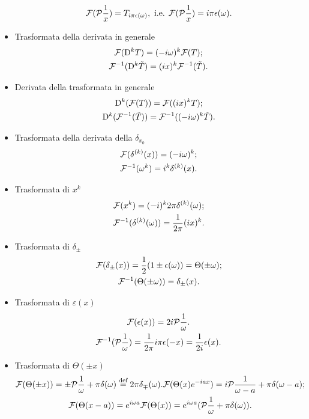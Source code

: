 \begin{itemize}
        \[
            \mathcal{F}({\mathcal{P}\frac{1}{x}})=T_{i\pi\epsilon(\omega)},\text{ i.e. } \mathcal{F}({\mathcal{P}\frac{1}{x}})=i\pi\epsilon(\omega).
        \]
    \item Trasformata della derivata in generale
        \begin{gather*}
            \mathcal{F}(\mathrm{D}^kT)=(-i\omega)^k\mathcal{F}(T);\\
            \mathcal{F}^{-1}(\mathrm{D}^k\Tilde{T})=(ix)^k\mathcal{F}^{-1}(\Tilde{T}).
        \end{gather*}
    \item Derivata della trasformata in generale
        \begin{gather*}
            \mathrm{D}^k(\mathcal{F}(T))=\mathcal{F}((ix)^kT);\\
            \mathrm{D}^k(\mathcal{F}^{-1}(\Tilde{T}))=\mathcal{F}^{-1}((-i\omega)^k\Tilde{T}).
        \end{gather*}
    \item Trasformata della derivata della $\delta_{x_0}$
        \begin{gather*}
            \mathcal{F}(\delta^{(k)}(x))=(-i\omega)^k;\\
            \mathcal{F}^{-1}(\omega^k)=i^k\delta^{(k)}(x).
        \end{gather*}
    \item Trasformata di $x^k$
        \begin{gather*}
            \mathcal{F}(x^k)=(-i)^k2\pi\delta^{(k)}(\omega);\\
            \mathcal{F}^{-1}(\delta^{(k)}(\omega))=\frac{1}{2\pi}(ix)^k.
        \end{gather*}
    \item Trasformata di $\delta_\pm$
        \begin{gather*}
            \mathcal{F}(\delta_{\pm}(x))=\frac{1}{2}(1\pm\epsilon(\omega))=\Theta(\pm\omega);\\
            \mathcal{F}^{-1}(\Theta(\pm\omega))=\delta_\pm(x).
        \end{gather*}
    \item Trasformata di $\varepsilon(x)$
        \begin{gather*}
            \mathcal{F}(\epsilon(x))=2i\mathcal{P}\frac{1}{\omega}.\\
            \mathcal{F}^{-1}(\mathcal{P}\frac{1}{\omega})=\frac{1}{2\pi}i\pi\epsilon(-x)=\frac{1}{2i}\epsilon(x).
        \end{gather*}
    \item Trasformata di $\Theta(\pm x)$
        \begin{gather*}
            \mathcal{F}(\Theta(\pm x))=\pm\mathcal{P}\frac{1}{\omega}+\pi\delta(\omega)\stackrel{\text{def}}{=}2\pi\delta_\mp(\omega).
            \mathcal{F}(\Theta(x)e^{-iax})=i\mathcal{P}\frac{1}{\omega-a}+\pi\delta(\omega-a);\\
            \mathcal{F}(\Theta(x-a))=e^{i\omega a}\mathcal{F}(\Theta(x))=e^{i\omega a}(\mathcal{P}\frac{1}{\omega}+\pi\delta(\omega)).
        \end{gather*}
    \end{itemize}    